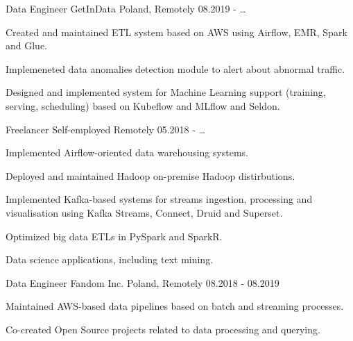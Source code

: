

\begin{cventries}

  \cventry
    {Data Engineer} %
    {GetInData} %
    {Poland, Remotely} %
    {08.2019 - \ldots} %
    {
      \begin{cvitems} %
        \item {Created and maintained ETL system based on AWS using Airflow, EMR, Spark and Glue.}
        \item {Implemeneted data anomalies detection module to alert about abnormal traffic.}
        \item {Designed and implemented system for Machine Learning support (training, serving, scheduling) based on Kubeflow and MLflow and Seldon.}
      \end{cvitems}
    }

  \cventry
    {Freelancer} %
    {Self-employed} %
    {Remotely} %
    {05.2018 - \ldots} %
    {
      \begin{cvitems} %
        \item {Implemented Airflow-oriented data warehousing systems.}
        \item {Deployed and maintained Hadoop on-premise Hadoop distirbutions.}
        \item {Implemented Kafka-based systems for streams ingestion, processing and visualisation using Kafka Streams, Connect, Druid and Superset.}
        \item {Optimized big data ETLs in PySpark and SparkR.}
        \item {Data science applications, including text mining.}
      \end{cvitems}
    }

  \cventry
    {Data Engineer} %
    {Fandom Inc.} %
    {Poland, Remotely} %
    {08.2018 - 08.2019} %
    {
      \begin{cvitems} %
        \item {Maintained AWS-based data pipelines based on batch and streaming processes.}
        \item {Co-created Open Source projects related to data processing and querying.}
      \end{cvitems}
    }


\end{cventries}
